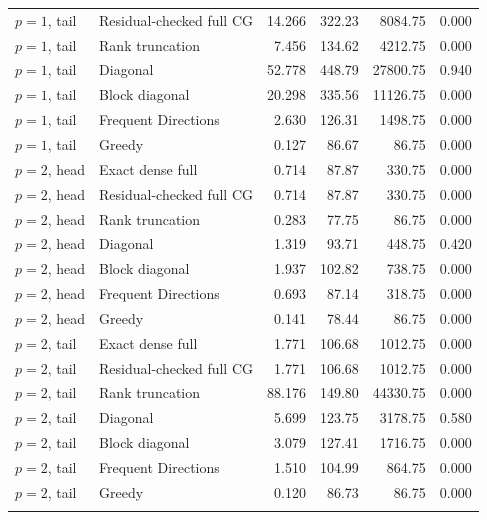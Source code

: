 \begin{tabular}{llrrrr}
$p=1$, tail & Residual-checked full CG & 14.266 & 322.23 & 8084.75 & 0.000 \\
$p=1$, tail & Rank truncation & 7.456 & 134.62 & 4212.75 & 0.000 \\
$p=1$, tail & Diagonal & 52.778 & 448.79 & 27800.75 & 0.940 \\
$p=1$, tail & Block diagonal & 20.298 & 335.56 & 11126.75 & 0.000 \\
$p=1$, tail & Frequent Directions & 2.630 & 126.31 & 1498.75 & 0.000 \\
$p=1$, tail & Greedy & 0.127 & 86.67 & 86.75 & 0.000 \\
\addlinespace
$p=2$, head & Exact dense full & 0.714 & 87.87 & 330.75 & 0.000 \\
$p=2$, head & Residual-checked full CG & 0.714 & 87.87 & 330.75 & 0.000 \\
$p=2$, head & Rank truncation & 0.283 & 77.75 & 86.75 & 0.000 \\
$p=2$, head & Diagonal & 1.319 & 93.71 & 448.75 & 0.420 \\
$p=2$, head & Block diagonal & 1.937 & 102.82 & 738.75 & 0.000 \\
$p=2$, head & Frequent Directions & 0.693 & 87.14 & 318.75 & 0.000 \\
$p=2$, head & Greedy & 0.141 & 78.44 & 86.75 & 0.000 \\
\addlinespace
$p=2$, tail & Exact dense full & 1.771 & 106.68 & 1012.75 & 0.000 \\
$p=2$, tail & Residual-checked full CG & 1.771 & 106.68 & 1012.75 & 0.000 \\
$p=2$, tail & Rank truncation & 88.176 & 149.80 & 44330.75 & 0.000 \\
$p=2$, tail & Diagonal & 5.699 & 123.75 & 3178.75 & 0.580 \\
$p=2$, tail & Block diagonal & 3.079 & 127.41 & 1716.75 & 0.000 \\
$p=2$, tail & Frequent Directions & 1.510 & 104.99 & 864.75 & 0.000 \\
$p=2$, tail & Greedy & 0.120 & 86.73 & 86.75 & 0.000 \\
\addlinespace
\bottomrule
\end{tabular}
